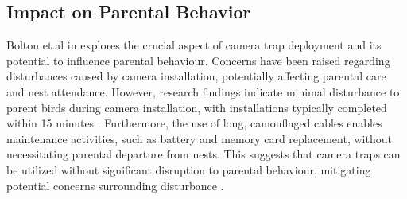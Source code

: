 \documentclass[class=report,11pt,crop=false]{standalone}
\begin{document}
\subsection{Impact on Parental Behavior}
Bolton et.al in \cite{bolton2007remote} explores the crucial aspect of camera trap deployment and its potential to influence parental behaviour. Concerns have been raised regarding disturbances caused by camera installation, potentially affecting parental care and nest attendance. However, research findings indicate minimal disturbance to parent birds during camera installation, with installations typically completed within 15 minutes \cite{bolton2007remote}. Furthermore, the use of long, camouflaged cables enables maintenance activities, such as battery and memory card replacement, without necessitating parental departure from nests. This suggests that camera traps can be utilized without significant disruption to parental behaviour, mitigating potential concerns surrounding disturbance \cite{bolton2007remote}.

\ifstandalone

\printnoidxglossary[type=\acronymtype,nonumberlist]
\fi
\end{document}
